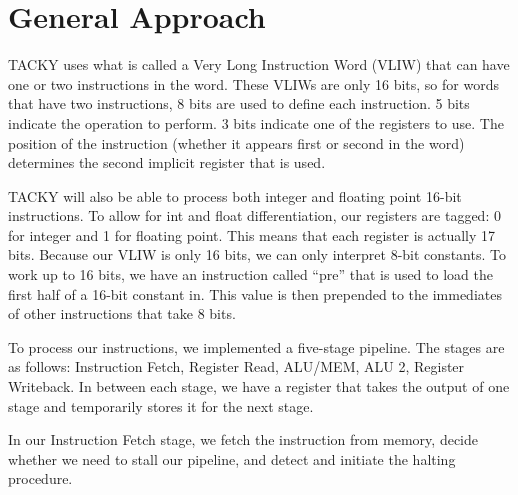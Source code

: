 \documentclass[sigconf]{acmart}
\begin{document}
%

%
\maketitle

\section{General Approach}

TACKY uses what is called a Very Long Instruction Word (VLIW) that can have one or two instructions in the word. These VLIWs are only 16 bits, so for words that have two instructions, 8 bits are used to define each instruction. 5 bits indicate the operation to perform. 3 bits indicate one of the registers to use. The position of the instruction (whether it appears first or second in the word) determines the second implicit register that is used.

TACKY will also be able to process both integer and floating point 16-bit instructions. To allow for int and float differentiation, our registers are tagged: 0 for integer and 1 for floating point. This means that each register is actually 17 bits. Because our VLIW is only 16 bits, we can only interpret 8-bit constants. To work up to 16 bits, we have an instruction called “pre” that is used to load the first half of a 16-bit constant in. This value is then prepended to the immediates of other instructions that take 8 bits.

To process our instructions, we implemented a five-stage pipeline. The stages are as follows: Instruction Fetch, Register Read, ALU/MEM, ALU 2, Register Writeback. In between each stage, we have a register that takes the output of one stage and temporarily stores it for the next stage. 

In our Instruction Fetch stage, we fetch the instruction from memory, decide whether we need to stall our pipeline, and detect and initiate the halting procedure.
\end{document}
